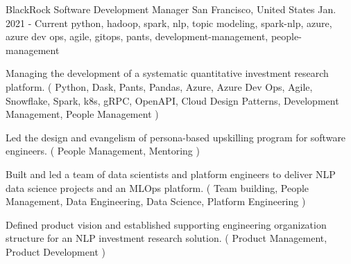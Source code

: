 \cventry
    {BlackRock} %
    {Software Development Manager} %
    {San Francisco, United States} %
    {Jan. 2021 - Current} %
    { python, hadoop, spark, nlp, topic modeling, spark-nlp, azure, azure dev ops, agile, gitops, pants, development-management, people-management} %
    {
    \begin{cvitems} %
       \item { Managing the development of a systematic quantitative investment research platform. ( Python, Dask, Pants, Pandas, Azure, Azure Dev Ops, Agile, Snowflake, Spark, k8s, gRPC, OpenAPI, Cloud Design Patterns, Development Management, People Management ) }
       \item { Led the design and evangelism of persona-based upskilling program for software engineers. ( People Management, Mentoring ) }
       \item { Built and led a team of data scientists and platform engineers to deliver NLP data science projects and an MLOps platform. ( Team building, People Management, Data Engineering, Data Science, Platform Engineering ) }
       \item { Defined product vision and established supporting engineering organization structure for an NLP investment research solution. ( Product Management, Product Development ) }
    \end{cvitems}
    }
